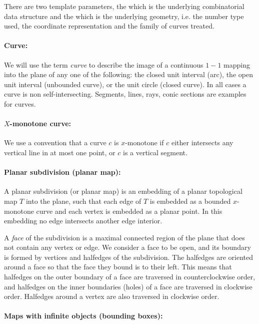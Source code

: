    There are two template parameters, the  which is the
   underlying combinatorial data structure and the  which
   is the underlying geometry, i.e. the number type used, the
   coordinate representation and the family of curves treated.

\paragraph{Curve:}
We will use the term {\it curve} to describe the image of a continuous
$1\!\!-\!\!1$ mapping into the plane of any one of the following: the
closed unit interval (arc), the open unit interval (unbounded curve),
or the unit circle (closed curve). In all cases a curve is non
self-intersecting. Segments, lines, rays, conic sections are examples for curves.

\paragraph{$X$-monotone curve:}
We
use a convention
that a curve $c$ is $x$-monotone if $c$ either intersects 
any vertical line in at most one point, or $c$ is a vertical
segment. 

\paragraph{Planar subdivision (planar map):}
A planar subdivision (or planar map) is an embedding of a planar 
topological map $T$ 
into the plane, such that each edge of $T$ is embedded as a
bounded $x$-monotone curve and each vertex is embedded as a planar point.
In this embedding no
edge intersects another edge interior.

A {\em face} of the subdivision is a maximal connected region of the
plane that does not contain any vertex or edge. 
We consider a face to be open, and its boundary is
formed by vertices and halfedges of the subdivision.
The halfedges are oriented around a face so that the face they bound
is to their left. This means that halfedges on the outer boundary
of a face are traversed in counterclockwise order, and halfedges on the inner
boundaries (holes) of a face are traversed in clockwise order. Halfedges 
around a vertex are also traversed in clockwise order. 

\paragraph{Maps with infinite objects (bounding boxes):}

